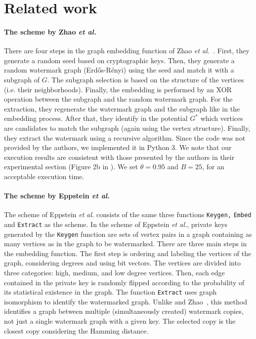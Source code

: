 \section{Related work}
\label{ss:Zhao-Eppstein}

\paragraph*{The scheme by Zhao \textit{et al.}~\cite{COSN}} There are four steps in the graph embedding function of Zhao \textit{et al.}~\cite{COSN}.
First, they generate a random seed based on cryptographic keys. Then, they generate a random watermark graph (Erdős-Rényi) using the seed and match it with a subgraph of $G$. The subgraph selection is based on the structure of the vertices (i.e. their neighborhoods). Finally, the embedding is performed by an XOR operation between the subgraph and the random watermark graph.
For the extraction, they regenerate the watermark graph and the subgraph like in the embedding process. After that, they identify in the potential $G^*$ which vertices are candidates to match the subgraph (again using the vertex structure). Finally, they extract the watermark using a recursive algorithm.
Since the code was not provided by the authors, we implemented it in Python 3. We note that our execution results are consistent with those presented by the authors in their experimental section (Figure 2b in \cite{COSN}). We set $\theta=0.95$ and $B=25$, for an acceptable execution time.

\paragraph*{The scheme by Eppstein \textit{et al.} ~\cite{isc}} The scheme of Eppstein \textit{et al.}\cite{isc} consists of the same three functions \texttt{Keygen,} \texttt{Embed} and \texttt{Extract} as the \scheme scheme. In the scheme of Eppstein \textit{et al.}, private keys generated by the \texttt{Keygen} function are sets of vertex pairs in a graph containing as many vertices as in the graph to be watermarked. There are three main steps in the embedding function. The first step is ordering and labeling the vertices of the graph, considering degrees and using bit vectors. The vertices are divided into three categories: high, medium, and low degree vertices. Then, each edge contained in the private key is randomly flipped according to the probability of its statistical existence in the graph. The function \texttt{Extract} uses graph isomorphism to identify the watermarked graph. Unlike \scheme and Zhao~\cite{COSN}, this method identifies a graph between multiple (simultaneously created) watermark copies, not just a single watermark graph with a given key. The selected copy is the closest copy considering the Hamming distance.
